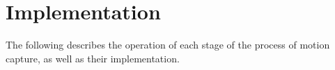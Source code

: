 \section{Implementation}\label{implementacionPosta}
The following describes the operation of each stage of the process of motion capture, as well as their implementation.



